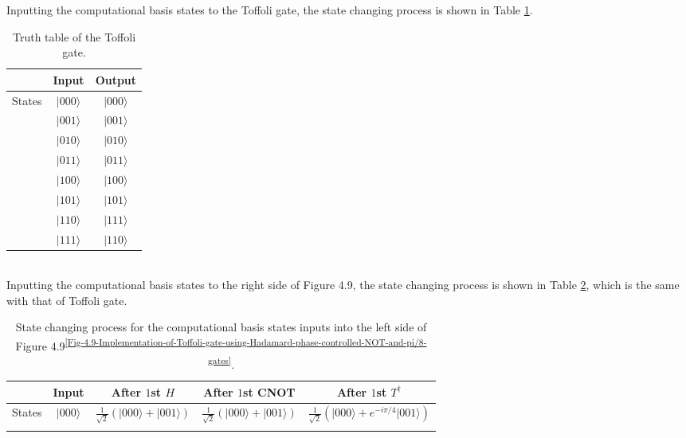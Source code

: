 \documentclass[en]{sol-man}
\begin{document}
\begin{pf}
    Inputting the computational basis states to the Toffoli gate, the state changing process is shown in Table \ref{E4.24-state-changing-process-1}.
    \begin{table}[h]
        \centering
        \caption{Truth table of the Toffoli gate.}
        \label{E4.24-state-changing-process-1}
        \begin{tabular}{|c|c|c|}
        \hline
        & Input & Output \\ \hline
        \multirow{8}{*}{States} & $\lvert 000\rangle$ & $\lvert 000\rangle$ \\ \cline{2-3} 
        & $\lvert 001\rangle$ & $\lvert 001\rangle$ \\ \cline{2-3} 
        & $\lvert 010\rangle$ & $\lvert 010\rangle$ \\ \cline{2-3} 
        & $\lvert 011\rangle$ & $\lvert 011\rangle$ \\ \cline{2-3} 
        & $\lvert 100\rangle$ & $\lvert 100\rangle$ \\ \cline{2-3} 
        & $\lvert 101\rangle$ & $\lvert 101\rangle$ \\ \cline{2-3} 
        & $\lvert 110\rangle$ & $\lvert 111\rangle$ \\ \cline{2-3} 
        & $\lvert 111\rangle$ & $\lvert 110\rangle$ \\ \hline
        \end{tabular}
    \end{table}\\
    Inputting the computational basis states to the right side of Figure 4.9, the state changing process is shown in Table \ref{E4.24-state-changing-process-2}, which is the same with that of Toffoli gate.
    \begin{table}[h]
        \centering\scriptsize
        \caption{State changing process for the computational basis states inputs into the left side of Figure 4.9\textsuperscript{\ref{Fig-4.9-Implementation-of-Toffoli-gate-using-Hadamard-phase-controlled-NOT-and-pi/8-gates}}.}
        \label{E4.24-state-changing-process-2}
        \begin{tabular}{|c|c|c|c|c|}
            \hline
             & Input & After $1$st $H$ & After $1$st CNOT & After $1$st $T^{\dagger}$ \\ \hline
            \multirow{8}{*}{States} & $\lvert 000\rangle$ & $\frac{1}{\sqrt{2}}(\lvert 000\rangle+\lvert 001\rangle)$ & $\frac{1}{\sqrt{2}}(\lvert 000\rangle+\lvert 001\rangle)$ & $\frac{1}{\sqrt{2}}(\lvert 000\rangle+e^{-i\pi/4}\lvert 001\rangle)$ \\ \cline{2-5} 

\end{tabular}
\end{table}
\end{pf}
\end{document}
